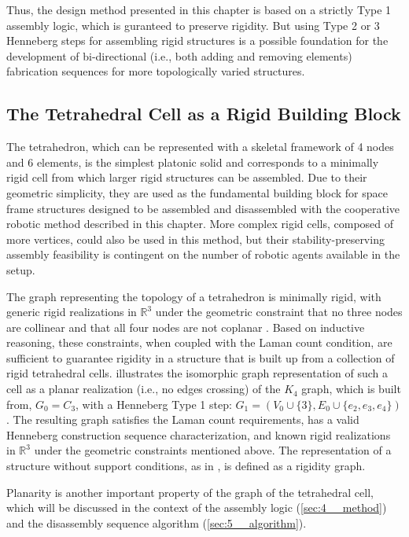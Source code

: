     Thus, the design method presented in this chapter is based on a strictly Type 1 assembly logic, which is guranteed to preserve rigidity. But using Type 2 or 3 Henneberg steps for assembling rigid structures is a possible foundation for the development of bi-directional (i.e., both adding and removing elements) fabrication sequences for more topologically varied structures.
    
\subsection{The Tetrahedral Cell as a Rigid Building Block} \label{sec:3__tetrahedral}
    The tetrahedron, which can be represented with a skeletal framework of 4 nodes and 6 elements, is the simplest platonic solid and corresponds to a minimally rigid cell from which larger rigid structures can be assembled. Due to their geometric simplicity, they are used as the fundamental building block for space frame structures designed to be assembled and disassembled with the cooperative robotic method described in this chapter. More complex rigid cells, composed of more vertices, could also be used in this method, but their stability-preserving assembly feasibility is contingent on the number of robotic agents available in the setup.
    
    The graph representing the topology of a tetrahedron is minimally rigid, with generic rigid realizations in $\mathbb{R}^3$ under the geometric constraint that no three nodes are collinear and that all four nodes are not coplanar \citep{tay_generating_1985}. Based on inductive reasoning, these constraints, when coupled with the Laman count condition, are sufficient to guarantee rigidity in a structure that is built up from a collection of rigid tetrahedral cells.  illustrates the isomorphic graph representation of such a cell as a planar realization (i.e., no edges crossing) of the $K_4$ graph, which is built from, $G_0 = C_3$, with a Henneberg Type 1 step: $G_1= (V_0\cup \{3\}, E_0 \cup \{e_2,e_3,e_4\})$. The resulting graph satisfies the Laman count requirements, has a valid Henneberg construction sequence characterization, and known rigid realizations in $\mathbb{R}^3$ under the geometric constraints mentioned above. The representation of a structure without support conditions, as in , is defined as a rigidity graph.
    
    Planarity is another important property of the graph of the tetrahedral cell, which will be discussed in the context of the assembly logic (\cref{sec:4__method}) and the disassembly sequence algorithm (\cref{sec:5__algorithm}). 
    
